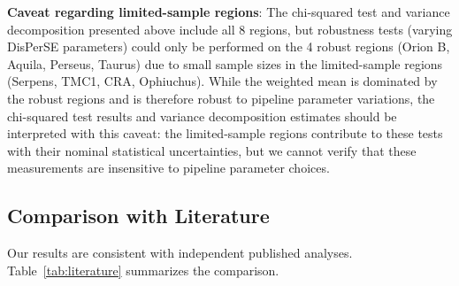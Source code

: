 \documentclass[11pt,a4paper]{article}
\begin{document}
\textbf{Caveat regarding limited-sample regions}: The chi-squared test and variance decomposition presented above include all 8 regions, but robustness tests (varying DisPerSE parameters) could only be performed on the 4 robust regions (Orion B, Aquila, Perseus, Taurus) due to small sample sizes in the limited-sample regions (Serpens, TMC1, CRA, Ophiuchus). While the weighted mean is dominated by the robust regions and is therefore robust to pipeline parameter variations, the chi-squared test results and variance decomposition estimates should be interpreted with this caveat: the limited-sample regions contribute to these tests with their nominal statistical uncertainties, but we cannot verify that these measurements are insensitive to pipeline parameter choices.

\subsection{Comparison with Literature}

Our results are consistent with independent published analyses. Table~\ref{tab:literature} summarizes the comparison.
\end{document}
